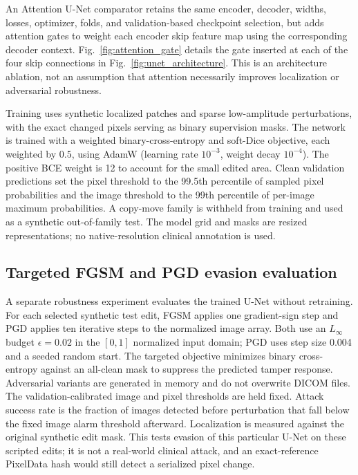 \documentclass[journal]{IEEEtran}
\begin{document}
  An Attention U-Net comparator retains the same encoder, decoder, widths, losses, optimizer, folds, and validation-based checkpoint selection, but adds attention gates to weight each encoder skip feature map using the corresponding decoder context. Fig.~\ref{fig:attention_gate} details the gate inserted at each of the four skip connections in Fig.~\ref{fig:unet_architecture}. This is an architecture ablation, not an assumption that attention necessarily improves localization or adversarial robustness.
  
  Training uses synthetic localized patches and sparse low-amplitude perturbations, with the exact changed pixels serving as binary supervision masks. The network is trained with a weighted binary-cross-entropy and soft-Dice objective, each weighted by $0.5$, using AdamW (learning rate $10^{-3}$, weight decay $10^{-4}$). The positive BCE weight is 12 to account for the small edited area. Clean validation predictions set the pixel threshold to the 99.5th percentile of sampled pixel probabilities and the image threshold to the 99th percentile of per-image maximum probabilities. A copy-move family is withheld from training and used as a synthetic out-of-family test. The model grid and masks are resized representations; no native-resolution clinical annotation is used.

  \subsection{Targeted FGSM and PGD evasion evaluation}
  A separate robustness experiment evaluates the trained U-Net without retraining. For each selected synthetic test edit, FGSM applies one gradient-sign step and PGD applies ten iterative steps to the normalized image array. Both use an $L_\infty$ budget $\epsilon=0.02$ in the $[0,1]$ normalized input domain; PGD uses step size 0.004 and a seeded random start. The targeted objective minimizes binary cross-entropy against an all-clean mask to suppress the predicted tamper response. Adversarial variants are generated in memory and do not overwrite DICOM files. The validation-calibrated image and pixel thresholds are held fixed. Attack success rate is the fraction of images detected before perturbation that fall below the fixed image alarm threshold afterward. Localization is measured against the original synthetic edit mask. This tests evasion of this particular U-Net on these scripted edits; it is not a real-world clinical attack, and an exact-reference PixelData hash would still detect a serialized pixel change.
  
\end{document}
